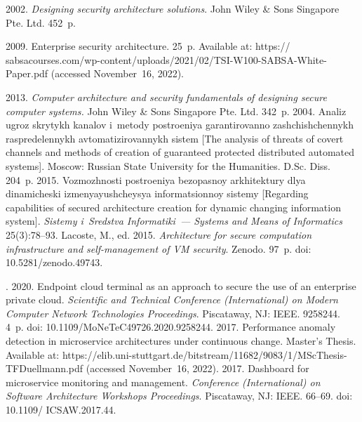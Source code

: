   \begin{multicols}{2}

\renewcommand{\bibname}{\protect\rmfamily References}

{\small\frenchspacing
 {%
 \begin{thebibliography}{99}
 2002. \textit{Designing security architecture solutions}. John 
Wiley \& Sons Singapore Pte. Ltd. 452~p.

 2009. Enterprise security architecture. 
25~p. Available at: {\sf  
https:// sabsacourses.com/wp-content/uploads/2021/02/TSI-W100-SABSA-White-Paper.pdf} (accessed 
November~16, 2022).

 2013. \textit{Computer architecture and security 
fundamentals of designing secure computer systems.} John Wiley \& Sons Singapore 
Pte. Ltd. 342~p.
 2004. Analiz ugroz skrytykh kanalov i~metody postroeniya 
garantirovanno zashchishchennykh raspredelennykh avtomatizirovannykh sistem [The 
analysis of threats of covert channels and methods of creation of guaranteed protected 
distributed automated systems]. Moscow: Russian State University for the Humanities. 
D.Sc. Diss. 204~p. 
 2015. 
Vozmozhnosti postroeniya bezopasnoy arkhitektury dlya dinamicheski 
izmenyayushcheysya informatsionnoy sistemy [Regarding capabilities of secured 
architecture creation for dynamic changing information system]. \textit{Sistemy 
i~Sredstva Informatiki~--- Systems and Means of Informatics} 25(3):78--93. 
Lacoste, M., ed. 2015. \textit{Architecture for secure computation infrastructure and 
self-management of VM security}. Zenodo. 97~p. doi: 10.5281/zenodo.49743.

. 2020. 
Endpoint cloud terminal as an approach to secure the use of an enterprise private cloud. 
\textit{Scientific and Technical Conference (International) on Modern Computer 
Network Technologies Proceedings}. Piscataway, NJ: IEEE. 9258244. 4~p. doi: 
10.1109/\linebreak MoNeTeC49726.2020.9258244.
 2017. Performance anomaly detection in 
microservice architectures under continuous change. Master's Thesis. Available at: {\sf  
https://elib.\linebreak  uni-stuttgart.de/bitstream/11682/9083/1/MScThesis-TFDuellmann.pdf} 
(accessed November~16, 2022).
 2017. Dashboard for microservice monitoring and 
management. \textit{Conference (International) on Software Architecture Workshops 
Proceedings}. Piscataway, NJ: IEEE. 66--69.  doi: 10.1109/ \mbox{ICSAW}.2017.44.


\end{thebibliography}}}
\end{multicols}
